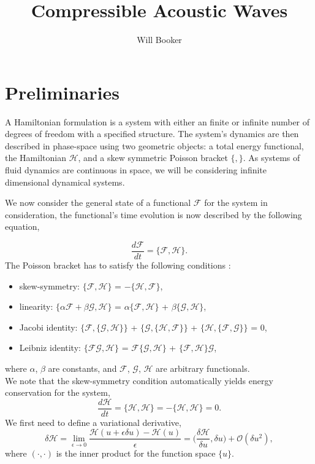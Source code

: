 \documentclass[a4paper,11pt]{article}
\author{Will Booker}
\title{Compressible Acoustic Waves}
\begin{document}
\maketitle

\section{Preliminaries}


A Hamiltonian formulation is a system with either an finite or infinite number of degrees of freedom with a specified structure. The system's dynamics are then described in phase-space using two geometric objects: a total energy functional,  the Hamiltonian $\mathcal{H}$, and a skew symmetric Poisson bracket $\{ , \}$.
As systems of fluid dynamics are continuous in space, we will be considering infinite dimensional dynamical systems. 



 We now consider the general state of a functional $\mathcal{F}$ for  the system in consideration, the functional's time evolution is now described by the following equation,

\begin{equation}
 \frac{ d \mathcal{F}}{dt} =\{\mathcal{F},\mathcal{H}\} .
\end{equation}
The Poisson bracket has to satisfy the following conditions :

\begin{itemize}
\item skew-symmetry: $\{\mathcal{F},\mathcal{H}\}$ = $-\{\mathcal{H},\mathcal{F}\}$,
\item linearity: $\{\alpha \mathcal{F} + \beta \mathcal{G},\mathcal{H}\}$ = $\alpha \{\mathcal{F},\mathcal{H}\}$ + $\beta\{\mathcal{G},\mathcal{H}\}$,
\item Jacobi identity: $ \{\mathcal{F},\{\mathcal{G},\mathcal{H}\}\}$ + $ \{\mathcal{G},\{\mathcal{H},\mathcal{F}\}\}$ + $ \{\mathcal{H},\{\mathcal{F},\mathcal{G}\}\}$ = 0,
\item Leibniz identity:   $\{\mathcal{F}\mathcal{G},\mathcal{H}\}$ = $\mathcal{F}\{\mathcal{G},\mathcal{H}\}$ + $\{\mathcal{F},\mathcal{H}\}\mathcal{G}$,
\end{itemize}
where $\alpha$, $\beta$ are constants, and $\mathcal{F}$, $\mathcal{G}$, $\mathcal{H}$ are arbitrary functionals. \\
We  note that the skew-symmetry condition automatically yields energy conservation for the system,
\[\frac{d \mathcal{H}}{dt} = \{\mathcal{H},\mathcal{H}\}= -\{\mathcal{H},\mathcal{H}\} = 0.\]
We first  need to define a variational derivative, 
\begin{equation}\label{eqns:var_deriv}
\delta \mathcal{H} = \lim_{\epsilon \rightarrow 0}\frac{ \mathcal{H}( u+ \epsilon\delta u)-  \mathcal{H}(u)}{\epsilon}= \bigg ( \frac{\delta  \mathcal{H}}{\delta u}, \delta u \bigg)+  \mathcal{O}(\delta u^2),
\end{equation}
where $(\cdot,\cdot)$ is the inner product for the function space $\{ u\}$.
\end{document}
